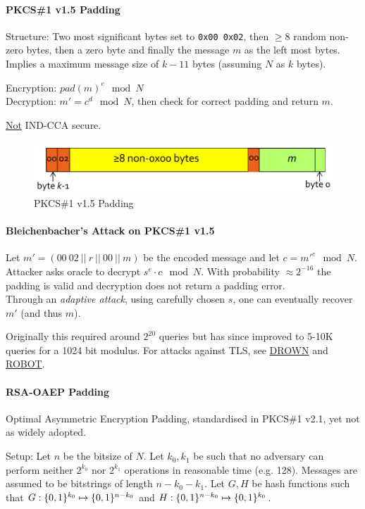\paragraph{PKCS\#1 v1.5 Padding}
Structure:
Two most significant bytes set to \mbox{\texttt{0x00 0x02}},
then $\geq 8$ random non-zero bytes,
then a zero byte and finally the message $m$ as the left most bytes.
Implies a maximum message size of $k-11$ bytes (assuming $N$ as $k$ bytes).

Encryption: $pad(m)^e \mod N$ \\
Decryption: $m' = c^d \mod N$, then check for correct padding and return $m$.

\underline{Not} IND-CCA secure.

\begin{figure}[h]
    \centering
	\includegraphics[scale=0.4]{images/rsa-pkcs.png}
    \caption{PKCS\#1 v1.5 Padding}
    \label{fig:rsa-pkcs}
\end{figure}

\paragraph{Bleichenbacher's Attack on PKCS\#1 v1.5}
Let $m' = (00\ 02\ ||\ r\ ||\ 00\ ||\ m)$ be the encoded message and let $c = m'^e \mod N$.
Attacker asks oracle to decrypt $s^e \cdot c \mod N$.
With probability $\approx 2^{-16}$ the padding is valid and decryption does not return a padding error.
\\
Through an \emph{adaptive attack}, using carefully chosen $s$, one can eventually recover $m'$ (and thus $m$).

Originally this required around $2^{20}$ queries but has since improved to 5-10K queries for a 1024 bit modulus.
For attacks against TLS, see \href{https://drownattack.com/}{DROWN} and \href{https://robotattack.org/}{ROBOT}.

\paragraph{RSA-OAEP Padding}
Optimal Asymmetric Encryption Padding, standardised in PKCS\#1 v2.1, yet not as widely adopted.

Setup:
Let $n$ be the bitsize of $N$.
Let $k_0, k_1$ be such that no adversary can perform neither $2^{k_0}$ nor $2^{k_1}$ operations in reasonable time (e.g. 128).
Messages are assumed to be bitstrings of length $n - k_0 - k_1$.
Let $G, H$ be hash functions such that
$G: \lbrace 0, 1 \rbrace^{k_0} \mapsto \lbrace 0, 1 \rbrace^{n-k_0}$
and $H: \lbrace 0, 1 \rbrace^{n-k_0} \mapsto \lbrace 0, 1 \rbrace^{k_0}$.


